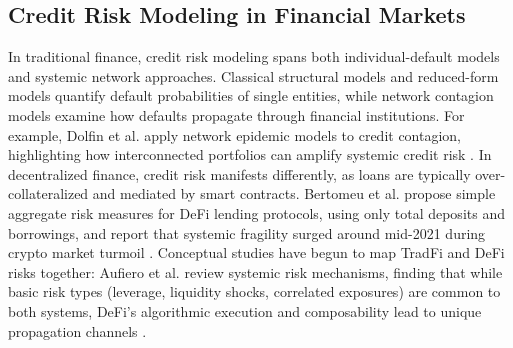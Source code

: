 
\subsection{Credit Risk Modeling in Financial Markets}
In traditional finance, credit risk modeling spans both individual-default models and systemic network approaches.  Classical structural models and reduced-form models quantify default probabilities of single entities, while network contagion models examine how defaults propagate through financial institutions.  For example, Dolfin et al. apply network epidemic models to credit contagion, highlighting how interconnected portfolios can amplify systemic credit risk \cite{math7080713}.  
In decentralized finance, credit risk manifests differently, as loans are typically over-collateralized and mediated by smart contracts. Bertomeu et al. propose simple aggregate risk measures for DeFi lending protocols, using only total deposits and borrowings, and report that systemic fragility surged around mid-2021 during crypto market turmoil \cite{BERTOMEU2024105321}. Conceptual studies have begun to map TradFi and DeFi risks together: Aufiero et al. review systemic risk mechanisms, finding that while basic risk types (leverage, liquidity shocks, correlated exposures) are common to both systems, DeFi's algorithmic execution and composability lead to unique propagation channels \cite{aufiero2025mappingmicroscopicsystemicrisks}.

